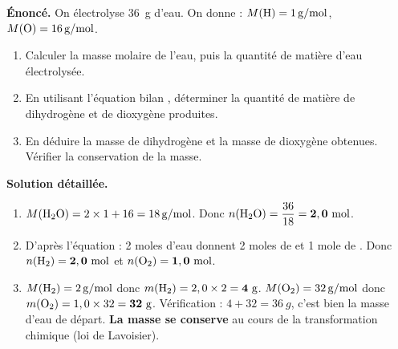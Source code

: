 \documentclass[11pt]{article}
\begin{document}
\begin{exoresolu}
\textbf{Énoncé.} On électrolyse \SI{36}{g} d'eau. On donne : $M(\ce{H}) = \SI{1}{g/mol}$, $M(\ce{O}) = \SI{16}{g/mol}$.
\begin{enumerate}
    \item Calculer la masse molaire de l'eau, puis la quantité de matière d'eau électrolysée.
    \item En utilisant l'équation bilan , déterminer la quantité de matière de dihydrogène et de dioxygène produites.
    \item En déduire la masse de dihydrogène et la masse de dioxygène obtenues. Vérifier la conservation de la masse.
\end{enumerate}
\tcblower
\textbf{Solution détaillée.}
\begin{enumerate}
    \item $M(\ce{H2O}) = 2 \times 1 + 16 = \SI{18}{g/mol}$. Donc $n(\ce{H2O}) = \dfrac{36}{18} = \mathbf{2,0 \text{ mol}}$.
    \item D'après l'équation  : 2 moles d'eau donnent 2 moles de  et 1 mole de . Donc $n(\ce{H2}) = \mathbf{2,0 \text{ mol}}$ et $n(\ce{O2}) = \mathbf{1,0 \text{ mol}}$.
    \item $M(\ce{H2}) = \SI{2}{g/mol}$ donc $m(\ce{H2}) = 2,0 \times 2 = \mathbf{4 \text{ g}}$. $M(\ce{O2}) = \SI{32}{g/mol}$ donc $m(\ce{O2}) = 1,0 \times 32 = \mathbf{32 \text{ g}}$. Vérification : $4 + 32 = \SI{36}{g}$, c'est bien la masse d'eau de départ. \textbf{La masse se conserve} au cours de la transformation chimique (loi de Lavoisier).
\end{enumerate}
\end{exoresolu}
\end{document}
